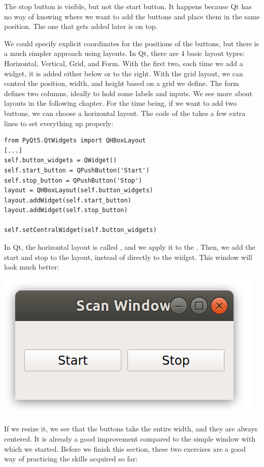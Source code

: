 The stop button is visible, but not the start button. It happens because Qt has no way of knowing where we want to add the buttons and place them in the same position. The one that gets added later is on top.


We could specify explicit coordinates for the positions of the buttons, but there is a much simpler approach using layouts. In Qt, there are 4 basic layout types: Horizontal, Vertical, Grid, and Form. With the first two, each time we add a widget, it is added either below or to the right. With the grid layout, we can control the position, width, and height based on a grid we define. The form defines two columns, ideally to hold some labels and inputs. We see more about layouts in the following chapter. For the time being, if we want to add two buttons, we can choose a horizontal layout. The code of the  takes a few extra lines to set everything up properly:

\begin{verbatim}
from PyQt5.QtWidgets import QHBoxLayout
[...]
self.button_widgets = QWidget()
self.start_button = QPushButton('Start')
self.stop_button = QPushButton('Stop')
layout = QHBoxLayout(self.button_widgets)
layout.addWidget(self.start_button)
layout.addWidget(self.stop_button)

self.setCentralWidget(self.button_widgets)
\end{verbatim}

In Qt, the horizontal layout is called , and we apply it to the . Then, we add the start and stop to the layout, instead of directly to the widget. This window will look much better:

\begin{center}
    \includegraphics[width=.3\textwidth]{images/Chapter_08/06_window_with_layout.png}
\end{center}

If we resize it, we see that the buttons take the entire width, and they are always centered. It is already a good improvement compared to the simple window with which we started. Before we finish this section, these two exercises are a good way of practicing the skills acquired so far:

